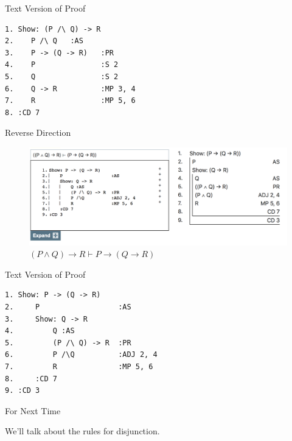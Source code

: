 \documentclass[
  ignorenonframetext,
]{beamer}
\renewcommand{\,}{\text{, }}
\begin{document}
\begin{frame}[fragile]{Text Version of Proof}
\protect\hypertarget{text-version-of-proof}{}

\begin{verbatim}
1. Show: (P /\ Q) -> R
2.    P /\ Q   :AS
3.    P -> (Q -> R)   :PR
4.    P               :S 2
5.    Q               :S 2
6.    Q -> R          :MP 3, 4
7.    R               :MP 5, 6
8. :CD 7
\end{verbatim}

\end{frame}

\begin{frame}{Reverse Direction}
\protect\hypertarget{reverse-direction}{}

\begin{figure}
\centering
\includegraphics{../images/class05/Class-05-3.png}
\caption{\((P \wedge Q) \rightarrow R \vdash P \rightarrow (Q \rightarrow R)\)}
\end{figure}

\end{frame}

\begin{frame}[fragile]{Text Version of Proof}
\protect\hypertarget{text-version-of-proof-1}{}

\begin{verbatim}
1. Show: P -> (Q -> R)
2.     P                  :AS
3.     Show: Q -> R
4.         Q :AS
5.         (P /\ Q) -> R  :PR
6.         P /\Q          :ADJ 2, 4
7.         R              :MP 5, 6
8.     :CD 7
9. :CD 3
\end{verbatim}

\end{frame}

\begin{frame}{For Next Time}
\protect\hypertarget{for-next-time}{}

We'll talk about the rules for disjunction.

\end{frame}
\end{document}
